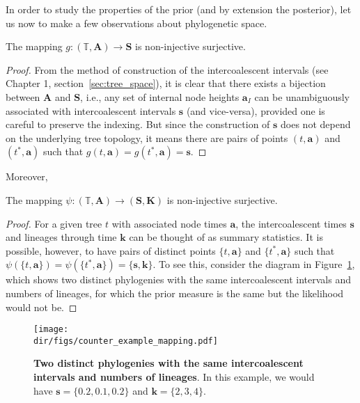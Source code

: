 In order to study the properties of the prior (and by extension the posterior), let us now to make a few observations about phylogenetic space.
\begin{remark}
\label{rmk:TBtoS}
 The mapping $g: (\mathbb{T}, \boldsymbol A) \to \boldsymbol S$ is non-injective surjective.
\end{remark}
\begin{proof}
From the method of construction of the intercoalescent intervals (see Chapter 1, section~\ref{sec:tree_space}), it is clear that there exists a bijection between $\boldsymbol A$ and $\boldsymbol S$, i.e., any set of internal node heights $\boldsymbol a_I$ can be unambiguously associated with intercoalescent intervals $\boldsymbol s$ (and vice-versa), provided one is careful to preserve the indexing.
But since the construction of $\boldsymbol s$ does not depend on the underlying tree topology, it means there are pairs of points $(t, \boldsymbol a)$ and $(t^\ast, \boldsymbol a)$ such that $g( t, \boldsymbol a) = g(t^\ast, \boldsymbol a) = \boldsymbol s$.
\end{proof}
Moreover,
\begin{remark}
\label{rmk:InvarCoal}
  The mapping $\psi : (\mathbb{T}, \boldsymbol A) \to (\boldsymbol S, \boldsymbol K)$ is non-injective surjective.
\end{remark}
\begin{proof}
 For a given tree  $t$ with associated node times $\boldsymbol a$, the intercoalescent times $\boldsymbol s$ and lineages through time $\boldsymbol k$ can be thought of as summary statistics.
It is possible, however, to have pairs of distinct points $\{t, \boldsymbol a\}$ and $\{t^\ast, \boldsymbol a\}$ such that $\psi( \{t, \boldsymbol a\}) = \psi(\{t^\ast, \boldsymbol a\}) = \{\boldsymbol s, \boldsymbol k\}$.
To see this, consider the diagram in Figure~\ref{fig:cexample}, which shows two distinct phylogenies with the same intercoalescent intervals and numbers of lineages, for which the prior measure is the same but the likelihood would not be.%
\end{proof}

\begin{figure}[!ht]
  \centering
  \texttt{[image: \\dir/figs/counter\_example\_mapping.pdf]}
\caption[Two distinct phylogenies with the same intercoalescent intervals and numbers of lineages.]{\textbf{Two distinct phylogenies with the same intercoalescent intervals and numbers of lineages}.
In this example, we would have $\boldsymbol s = \{0.2, 0.1, 0.2\}$ and $\boldsymbol k = \{2, 3, 4\}$.
}
\label{fig:cexample}
\end{figure}

